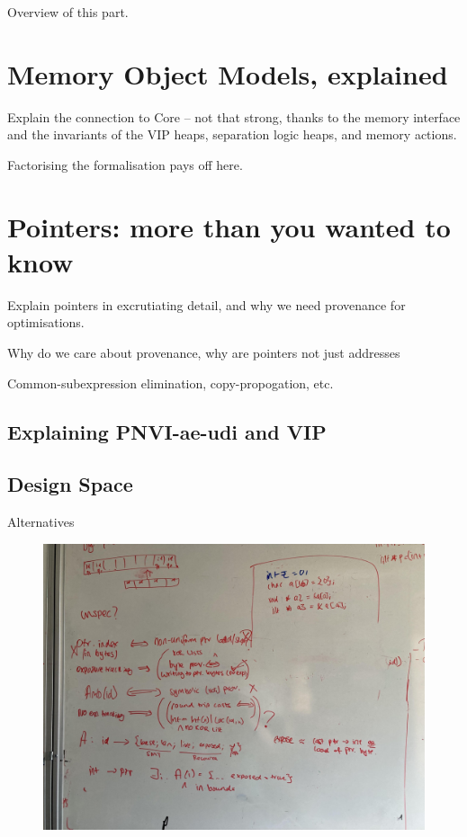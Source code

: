 Overview of this part.

\chapter{Memory Object Models, explained}
\label{chap:mem-model-explained}

Explain the connection to Core -- not that strong, thanks to the memory
interface and the invariants of the VIP heaps, separation logic heaps, and
memory actions.

Factorising the formalisation pays off here.

\chapter{Pointers: more than you wanted to know}

Explain pointers in excrutiating detail, and why we need provenance for
optimisations.

Why do we care about provenance, why are pointers not just addresses

Common-subexpression elimination, copy-propogation, etc.

\section{Explaining PNVI-ae-udi and VIP}

\section{Design Space}

Alternatives

\begin{figure}[h]
    \centering
    \includegraphics[width=\textwidth]{../misc/type-system-options.jpg}
\end{figure}


